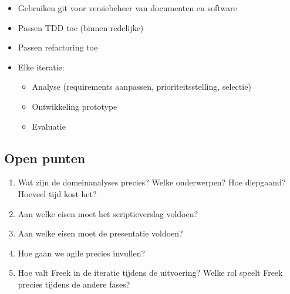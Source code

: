 \documentclass[a4paper,11pt,twoside,draft]{article}
\begin{document}
\begin{itemize}
 \item Gebruiken git voor versiebeheer van documenten en software
 \item Passen TDD toe (binnen redelijke)
 \item Passen refactoring toe
 \item Elke iteratie:
 \begin{itemize}
   \item Analyse (requirements aanpassen, prioriteitsstelling, selectie)
   \item Ontwikkeling prototype
   \item Evaluatie
 \end{itemize}
\end{itemize}


\subsection{Open punten}

\begin{enumerate}
 \item Wat zijn de domeinanalyses precies? Welke onderwerpen? Hoe diepgaand? Hoeveel tijd kost het?
 \item Aan welke eisen moet het scriptieverslag voldoen?
 \item Aan welke eisen moet de presentatie voldoen?
 \item Hoe gaan we agile precies invullen?
 \item Hoe valt Freek in de iteratie tijdens de uitvoering? Welke rol speelt Freek precies tijdens de andere fases?
\end{enumerate}
\end{document}
